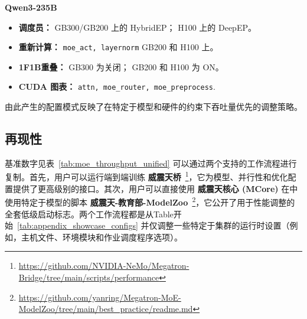 \textbf{Qwen3-235B}
\begin{itemize}[noitemsep,topsep=0pt]
    \item \textbf{调度员：} GB300/GB200 上的 HybridEP； H100 上的 DeepEP。
    \item \textbf{重新计算：} \texttt{moe\_act, layernorm} GB200 和 H100 上。
    \item \textbf{1F1B重叠：} GB300 为关闭； GB200 和 H100 为 ON。
    \item \textbf{CUDA 图表：} \texttt{attn, moe\_router, moe\_preprocess}.
\end{itemize}
由此产生的配置模式反映了在特定于模型和硬件的约束下吞吐量优先的调整策略。

\subsection{再现性} 
基准数字见表~\ref{tab:moe_throughput_unified} 可以通过两个支持的工作流程进行复制。首先，用户可以运行端到端训练 \textbf{威震天桥}~\footnote{\url{https://github.com/NVIDIA-NeMo/Megatron-Bridge/tree/main/scripts/performance}}，它为模型、并行性和优化配置提供了更高级别的接口。其次，用户可以直接使用 \textbf{威震天核心 (MCore)} 在中使用特定于模型的脚本 \textbf{威震天-教育部-ModelZoo}~\footnote{\url{https://github.com/yanring/Megatron-MoE-ModelZoo/tree/main/best_practice/readme.md}}，它公开了用于性能调整的全套低级启动标志。两个工作流程都是从Table开始~\ref{tab:appendix_showcase_configs} 并仅调整一些特定于集群的运行时设置（例如，主机文件、环境模块和作业调度程序选项）。



